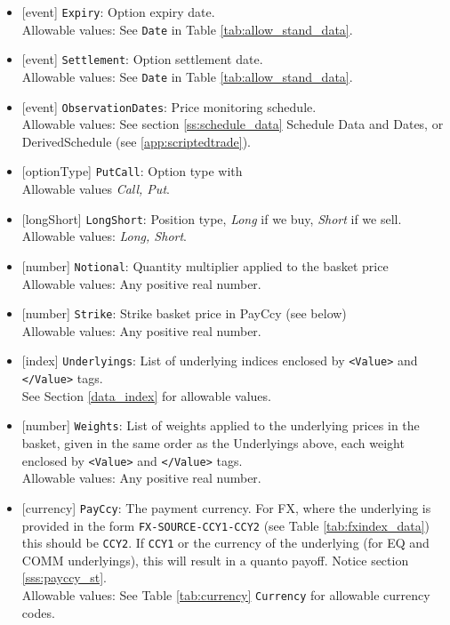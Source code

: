 \begin{itemize}
    \item{}[event] \lstinline!Expiry!: Option expiry date. \\
    Allowable values: See \lstinline!Date! in Table \ref{tab:allow_stand_data}.
    \item{}[event] \lstinline!Settlement!: Option settlement date. \\
    Allowable values: See \lstinline!Date! in Table \ref{tab:allow_stand_data}.
    \item{}[event] \lstinline!ObservationDates!: Price monitoring schedule. \\
    Allowable values: See section \ref{ss:schedule_data} Schedule Data and Dates, or DerivedSchedule (see \ref{app:scriptedtrade}).
    \item{}[optionType] \lstinline!PutCall!: Option type with \\
          Allowable values \emph{Call, Put}.
    \item{}[longShort] \lstinline!LongShort!: Position type,
          {\em Long} if we buy, {\em Short} if we sell.\\
    Allowable values: \emph{Long, Short}.
        \item{}[number] \lstinline!Notional!: Quantity multiplier applied to the
          basket price \\
          Allowable values: Any positive real number.
        \item{}[number] \lstinline!Strike!: Strike basket price in PayCcy (see
          below) \\
          Allowable values: Any positive real number.
    \item{}[index] \lstinline!Underlyings!: List of underlying indices
      enclosed by {\tt <Value>} and {\tt </Value>} tags. \\
      See Section \ref{data_index} for allowable values.
    \item{}[number] \lstinline!Weights!: List of weights applied to the
          underlying prices in the basket, given in the same order as
          the Underlyings above, each weight enclosed by {\tt <Value>} and {\tt </Value>} tags.\\
          Allowable values: Any positive real number.
    \item{}[currency] \lstinline!PayCcy!: The payment currency. For FX, where the underlying is provided
      in the form \lstinline!FX-SOURCE-CCY1-CCY2! (see Table \ref{tab:fxindex_data}) this should
      be \lstinline!CCY2!. If \lstinline!CCY1! or the currency of the underlying (for EQ and
      COMM underlyings), this will result in a quanto payoff. Notice section \ref{sss:payccy_st}. \\
        Allowable values: See Table \ref{tab:currency} \lstinline!Currency! for allowable currency codes.
\end{itemize}

